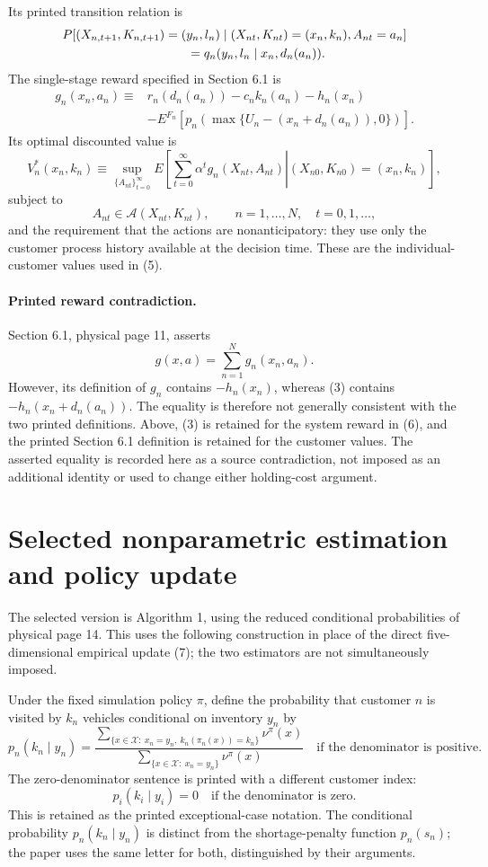 \documentclass{article}
\begin{document}
Its printed transition relation is
\[
\begin{aligned}
&P[(X_{n,t+1},K_{n,t+1})=(y_n,l_n)
\mid (X_{nt},K_{nt})=(x_n,k_n),A_{nt}=a_n]\\
&\hspace{35mm}=q_n(y_n,l_n\mid x_n,d_n(a_n)).
\end{aligned}
\]
The single-stage reward specified in Section 6.1 is
\[
\begin{aligned}
g_n(x_n,a_n)\equiv{}&r_n(d_n(a_n))-c_nk_n(a_n)-h_n(x_n)\\
&-E^{F_n}\!\left[p_n\!\left(\max\{U_n-(x_n+d_n(a_n)),0\}\right)\right].
\end{aligned}
\]
Its optimal discounted value is
\[
V_n^*(x_n,k_n)\equiv
\sup_{\{A_{nt}\}_{t=0}^{\infty}}
E\!\left[
\left.\sum_{t=0}^{\infty}\alpha^t g_n(X_{nt},A_{nt})
\right|(X_{n0},K_{n0})=(x_n,k_n)
\right],
\]
subject to
\[
A_{nt}\in\mathcal A(X_{nt},K_{nt}),
\qquad n=1,\ldots,N,\quad t=0,1,\ldots,
\]
and the requirement that the actions are nonanticipatory: they use only the customer process history available at the decision time. These are the individual-customer values used in (5).

\paragraph{Printed reward contradiction.}
Section 6.1, physical page 11, asserts
\[
g(x,a)=\sum_{n=1}^{N}g_n(x_n,a_n).
\]
However, its definition of $g_n$ contains $-h_n(x_n)$, whereas (3) contains $-h_n(x_n+d_n(a_n))$. The equality is therefore not generally consistent with the two printed definitions. Above, (3) is retained for the system reward in (6), and the printed Section 6.1 definition is retained for the customer values. The asserted equality is recorded here as a source contradiction, not imposed as an additional identity or used to change either holding-cost argument.

\section*{Selected nonparametric estimation and policy update}

The selected version is Algorithm 1, using the reduced conditional probabilities of physical page 14. This uses the following construction in place of the direct five-dimensional empirical update (7); the two estimators are not simultaneously imposed.

Under the fixed simulation policy $\pi$, define the probability that customer $n$ is visited by $k_n$ vehicles conditional on inventory $y_n$ by
\[
p_n(k_n\mid y_n)=
\frac{
\displaystyle\sum_{\{x\in\mathcal X:\ x_n=y_n,\ k_n(\pi_n(x))=k_n\}}\nu^\pi(x)
}{
\displaystyle\sum_{\{x\in\mathcal X:\ x_n=y_n\}}\nu^\pi(x)
}
\quad\text{if the denominator is positive}.
\]
The zero-denominator sentence is printed with a different customer index:
\[
p_i(k_i\mid y_i)=0\quad\text{if the denominator is zero}.
\]
This is retained as the printed exceptional-case notation. The conditional probability $p_n(k_n\mid y_n)$ is distinct from the shortage-penalty function $p_n(s_n)$; the paper uses the same letter for both, distinguished by their arguments.
\end{document}
